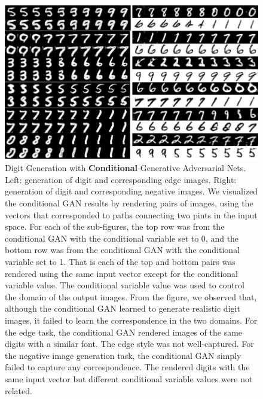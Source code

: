 \begin{figure}[thb!]
\centering
\includegraphics[trim=0.0in 0.0in 0.0in 0in, width=1.0\textwidth]{result_mnist_cgan.pdf}
\caption{Digit Generation with {\bf Conditional} Generative Adversarial Nets. Left:  generation of digit and corresponding edge images. Right: generation of digit and corresponding negative images. We visualized the conditional GAN results by rendering pairs of images, using the vectors that corresponded to paths connecting two pints in the input space. For each of the sub-figures, the top row was from the conditional GAN with the conditional variable set to 0, and the bottom row was from the conditional GAN with the conditional variable set to 1. That is each of the top and bottom pairs was rendered using the same input vector except for the conditional variable value. The conditional variable value was used to control the domain of the output images. From the figure, we observed that, although the conditional GAN learned to generate realistic digit images, it failed to learn the correspondence in the two domains. For the edge task, the conditional GAN rendered images of the same digits with a similar font. The edge style was not well-captured. For the negative image generation task, the conditional GAN simply failed to capture any correspondence. The rendered digits with the same input vector but different conditional variable values were not related. 
}
\label{fig::result_mnist_cgan_vis}
\end{figure}

